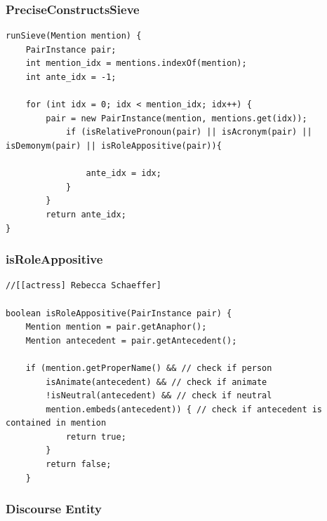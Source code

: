 \documentclass[11pt,a4paper]{beamer}
\begin{document}
\begin{frame}[fragile]
\frametitle{PreciseConstructsSieve}
\begin{lstlisting}
runSieve(Mention mention) {
	PairInstance pair;
	int mention_idx = mentions.indexOf(mention);
	int ante_idx = -1;
		
	for (int idx = 0; idx < mention_idx; idx++) {			
	    pair = new PairInstance(mention, mentions.get(idx));
	        if (isRelativePronoun(pair) || isAcronym(pair) || isDemonym(pair) || isRoleAppositive(pair)){ 	            
	            
	            ante_idx = idx;
			}
		}
		return ante_idx;
}
\end{lstlisting}
\end{frame}

\begin{frame}[fragile]
\frametitle{isRoleAppositive}
\begin{lstlisting}
//[[actress] Rebecca Schaeffer]

boolean isRoleAppositive(PairInstance pair) {
    Mention mention = pair.getAnaphor();
    Mention antecedent = pair.getAntecedent();
    
    if (mention.getProperName() && // check if person
        isAnimate(antecedent) && // check if animate
        !isNeutral(antecedent) && // check if neutral
        mention.embeds(antecedent)) { // check if antecedent is contained in mention							
            return true;
		}
		return false;
	}
\end{lstlisting}
\end{frame}

\begin{frame}
\frametitle{Discourse Entity}


\end{frame}
\end{document}
